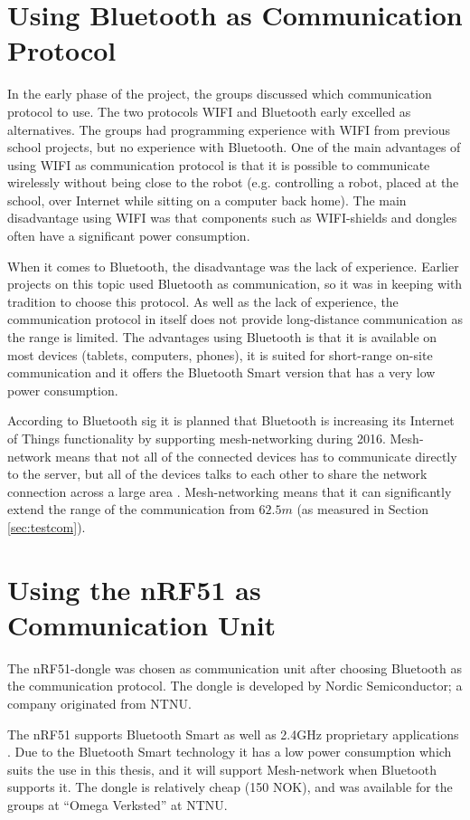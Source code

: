 \section{Using Bluetooth as Communication Protocol}
In the early phase of the project, the groups discussed which communication protocol to use. The two protocols WIFI and Bluetooth early excelled as alternatives. The groups had programming experience with WIFI from previous school projects, but no experience with Bluetooth. One of the main advantages of using WIFI as communication protocol is that it is possible to communicate wirelessly without being close to the robot (e.g. controlling a robot, placed at the school, over Internet while sitting on a computer back home). The main disadvantage using WIFI was that components such as WIFI-shields and dongles often have a significant power consumption.

When it comes to Bluetooth, the disadvantage was the lack of experience. Earlier projects on this topic used Bluetooth as communication, so it was in keeping with tradition to choose this protocol. As well as the lack of experience, the communication protocol in itself does not provide long-distance communication as the range is limited.  The advantages using Bluetooth is that it is available on most devices (tablets, computers, phones), it is suited for short-range on-site communication and it offers the Bluetooth Smart version that has a very low power consumption.

According to Bluetooth \acrshort{sig} \cite{mesh} it is planned that Bluetooth is increasing its Internet of Things functionality by supporting mesh-networking during 2016. Mesh-network means that not all of the connected devices has to communicate directly to the server, but all of the devices talks to each other to share the network connection across a large area \cite{howmesh}. Mesh-networking means that it can significantly extend the range of the communication from $62.5m$ (as measured in Section \ref{sec:testcom}).

\section{Using the nRF51 as Communication Unit}
The nRF51-dongle was chosen as communication unit after choosing Bluetooth as the communication protocol. The dongle is developed by Nordic Semiconductor; a  company originated from NTNU.

The nRF51 supports Bluetooth Smart as well as 2.4GHz proprietary applications \cite{nrf51Dongle}. Due to the Bluetooth Smart technology it has a low power consumption which suits the use in this thesis, and it will support Mesh-network when Bluetooth supports it. The dongle is relatively cheap (150 NOK), and was available for the groups at ``Omega Verksted'' at NTNU.

